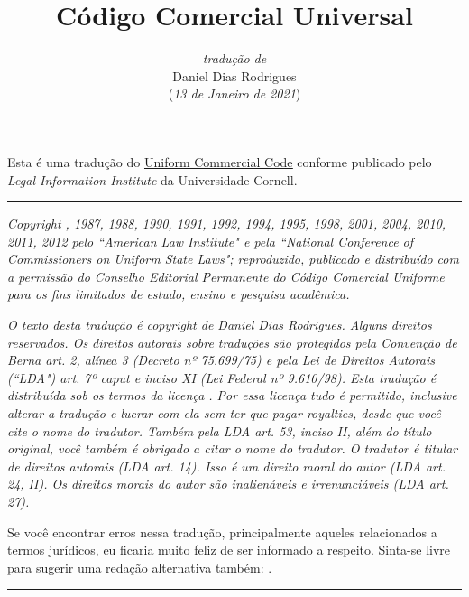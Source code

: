 \documentclass[a4paper, 12pt]{article}
\title{\textbf{Código Comercial Universal}}
\author{\textit{tradução de}\\Daniel Dias Rodrigues\\ (\textit{13 de Janeiro de 2021})}
\date{}
\begin{document}
\maketitle

Esta é uma tradução do \href{https://www.law.cornell.edu/ucc}{\underline{Uniform Commercial Code}} conforme publicado pelo \textit{Legal Information Institute} da Universidade Cornell.

\begin{center}
\rule{7cm}{0.4pt}
\end{center}

\textit{Copyright , 1987, 1988, 1990, 1991, 1992, 1994, 1995, 1998, 2001, 2004, 2010, 2011, 2012 pelo ``American Law Institute" e pela ``National Conference of Commissioners on Uniform State Laws"; reproduzido, publicado e distribuído com a permissão do Conselho Editorial Permanente do Código Comercial Uniforme para os fins limitados de estudo, ensino e pesquisa acadêmica.}

\vspace{5mm}

\textit{O texto desta tradução é copyright  de Daniel Dias Rodrigues. Alguns direitos reservados. Os direitos autorais sobre traduções são protegidos pela Convenção de Berna art. 2, alínea 3 (Decreto nº 75.699/75) e pela Lei de Direitos Autorais (``LDA") art. 7º caput e inciso XI (Lei Federal nº 9.610/98). Esta tradução é distribuída sob os termos da licença \href{https://creativecommons.org/licenses/by/4.0/deed.pt_BR}{\underline{}}. Por essa licença tudo é permitido, inclusive alterar a tradução e lucrar com ela sem ter que pagar royalties, desde que você cite o nome do tradutor. Também pela LDA art. 53, inciso II, além do título original, você também é obrigado a citar o nome do tradutor. O tradutor é titular de direitos autorais (LDA art. 14). Isso é um direito moral do autor (LDA art. 24, II). Os direitos morais do autor são inalienáveis e irrenunciáveis (LDA art. 27).}

\vspace{5mm}

Se você encontrar erros nessa tradução, principalmente aqueles relacionados a termos jurídicos, eu ficaria muito feliz de ser informado a respeito. Sinta-se livre para sugerir uma redação alternativa também: \href{mailto:danieldiasr@gmail.com}{\underline{}}.

\begin{center}
\rule{7cm}{0.4pt}
\end{center}
\end{document}
